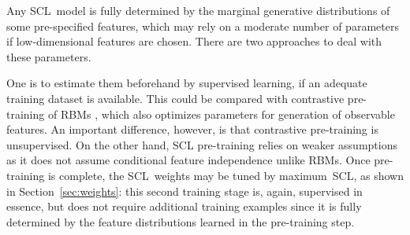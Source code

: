 \documentclass[english]{scrartcl}
\begin{document}
Any SCL~model is fully determined by the marginal generative distributions of some pre-specified features, which may rely on a moderate number of parameters if low-dimensional features are chosen. There are two approaches to deal with these parameters.

One is to estimate them beforehand by supervised learning, if an adequate training dataset is available. This could be compared with contrastive pre-training of RBMs \cite{Hinton-06,Fischer-14}, which also optimizes parameters for generation of observable features. An important difference, however, is that contrastive pre-training is unsupervised. On the other hand, SCL pre-training relies on weaker assumptions as it does not assume conditional feature independence unlike RBMs. Once pre-training is complete, the SCL~weights may be tuned by maximum~SCL, as shown in Section~\ref{sec:weights}: this second training stage is, again, supervised in essence, but does not require additional training examples since it is fully determined by the feature distributions learned in the pre-training step.


\end{document}
